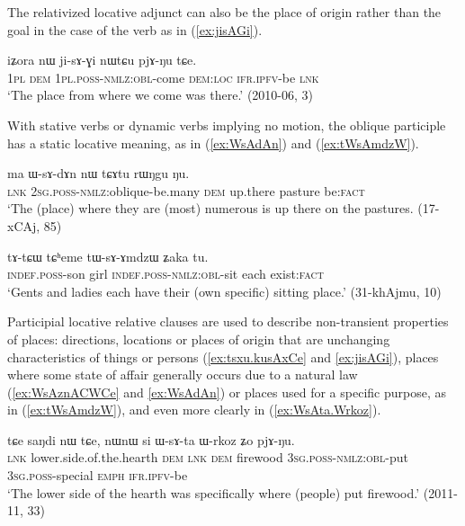 The relativized locative adjunct can also be the place of origin rather than the goal in the case of the verb  as in (\ref{ex:jisAGi}).

\begin{exe}
\ex \label{ex:jisAGi}
\gll  iʑora nɯ ji-sɤ-ɣi nɯtɕu pjɤ-ŋu tɕe. \\
\textsc{1pl} \textsc{dem} \textsc{1pl}.\textsc{poss}-\textsc{nmlz}:\textsc{obl}-come \textsc{dem}:\textsc{loc} \textsc{ifr}.\textsc{ipfv}-be \textsc{lnk} \\
\glt  `The place from where we come was there.' (2010-06, 3)
\end{exe}

With stative verbs or dynamic verbs implying no motion, the oblique participle has a static locative meaning, as in (\ref{ex:WsAdAn}) and (\ref{ex:tWsAmdzW}).

\begin{exe}
\ex \label{ex:WsAdAn}
\gll  ma ɯ-sɤ-dɤn nɯ tɕɤtu rɯŋgu ŋu. \\
\textsc{lnk} \textsc{2sg}.\textsc{poss}-\textsc{nmlz}:oblique-be.many \textsc{dem} up.there pasture be:\textsc{fact} \\
\glt `The (place) where they are (most) numerous is up there on the pastures. (17-xCAj, 85)
\end{exe}

\begin{exe}
\ex \label{ex:tWsAmdzW}
\gll tɤ-tɕɯ tɕʰeme tɯ-sɤ-ɤmdzɯ ʑaka tu. \\
\textsc{indef}.\textsc{poss}-son girl \textsc{indef}.\textsc{poss}-\textsc{nmlz}:\textsc{obl}-sit each exist:\textsc{fact} \\ 
\glt `Gents and ladies each have their (own specific) sitting place.' (31-khAjmu, 10)
\end{exe}


Participial locative relative clauses are used to describe non-transient properties of places: directions, locations or places of origin that are unchanging characteristics of things or persons (\ref{ex:tsxu.kusAxCe} and \ref{ex:jisAGi}), places where some state of affair generally occurs due to a natural law (\ref{ex:WsAznACWCe} and \ref{ex:WsAdAn}) or places used for a specific purpose, as in (\ref{ex:tWsAmdzW}), and even more clearly in (\ref{ex:WsAta.Wrkoz}).

\begin{exe}
\ex \label{ex:WsAta.Wrkoz}
\gll tɕe saŋdi nɯ tɕe, nɯnɯ si ɯ-sɤ-ta ɯ-rkoz ʑo pjɤ-ŋu. \\
  \textsc{lnk} lower.side.of.the.hearth \textsc{dem} \textsc{lnk} \textsc{dem} firewood \textsc{3sg}.\textsc{poss}-\textsc{nmlz}:\textsc{obl}-put \textsc{3sg}.\textsc{poss}-special \textsc{emph} \textsc{ifr}.\textsc{ipfv}-be \\
\glt `The lower side of the hearth was specifically where (people) put firewood.' (2011-11, 33)
\end{exe}



